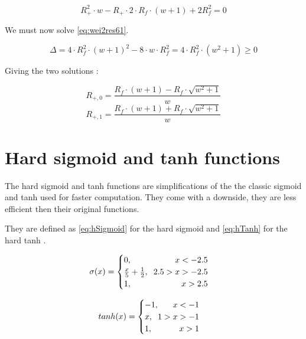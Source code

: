 \begin{equation}\label{eq:wei2res61}
  R_+^2\cdot w - R_+\cdot 2\cdot R_f \cdot(w+1) + 2R_f^2 = 0
\end{equation}

We must now solve \cref{eq:wei2res61}.

\begin{equation}\label{eq:wei2res61}
  \Delta = 4\cdot R_f^2\cdot(w+1)^2-8\cdot w\cdot R_f^2 = 4\cdot R_f^2\cdot(w^2+1) \ge 0
\end{equation}

Giving the two solutions :

\begin{equation}\label{eq:wei2res62}
  R_{+,0}=\frac{R_f\cdot(w+1)-R_f\cdot\sqrt{w^2+1}}{w}
\end{equation}
\begin{equation}\label{eq:wei2res63}
  R_{+,1}=\frac{R_f\cdot(w+1)+R_f\cdot\sqrt{w^2+1}}{w}
\end{equation}

\section{Hard sigmoid and \ac{tanh} functions}\label{apsec:hardFunc}

The hard sigmoid and \ac{tanh} functions are simplifications of the the classic sigmoid and \ac{tanh} used for faster computation. They come with a downside, they are less efficient then their original functions.

They are defined as \cref{eq:hSigmoid} for the hard sigmoid and \cref{eq:hTanh} for the hard \ac{tanh} \cite{hSigmoid, hTanh}.


\begin{equation}\label{eq:hSigmoid}
  \sigma (x) =
  \begin{cases}
    0, \hfill x< -2.5\\
    \frac{x}{5}+\frac{1}{2}, \hspace{0.2cm} 2.5>x>-2.5\\
    1, \hfill x> 2.5\\
  \end{cases}
\end{equation}

\begin{equation}\label{eq:hTanh}
  tanh(x) =
  \begin{cases}
    -1, \hfill x<-1\\
    x, \hspace{0.2cm} 1>x>-1\\
    1, \hfill x>1\\
  \end{cases}
\end{equation}
